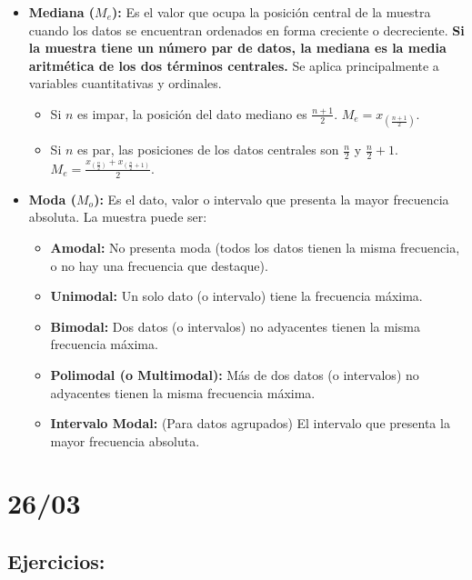 \documentclass[12pt, letterpaper]{article}
\begin{document}
\begin{itemize}
    \item \textbf{Mediana ($M_e$):} Es el valor que ocupa la posición central de la muestra cuando los datos se encuentran ordenados en forma creciente o decreciente. \textbf{Si la muestra tiene un número par de datos, la mediana es la media aritmética de los dos términos centrales.} Se aplica principalmente a variables cuantitativas y ordinales.
        \begin{itemize}
            \item Si $n$ es impar, la posición del dato mediano es $\frac{n+1}{2}$. $M_e = x_{(\frac{n+1}{2})}$.
            \item Si $n$ es par, las posiciones de los datos centrales son $\frac{n}{2}$ y $\frac{n}{2}+1$. $M_e = \frac{x_{(\frac{n}{2})} + x_{(\frac{n}{2}+1)}}{2}$.
        \end{itemize}
    \item \textbf{Moda ($M_o$):} Es el dato, valor o intervalo que presenta la mayor frecuencia absoluta. La muestra puede ser:
        \begin{itemize}
            \item \textbf{Amodal:} No presenta moda (todos los datos tienen la misma frecuencia, o no hay una frecuencia que destaque).
            \item \textbf{Unimodal:} Un solo dato (o intervalo) tiene la frecuencia máxima.
            \item \textbf{Bimodal:} Dos datos (o intervalos) no adyacentes tienen la misma frecuencia máxima.
            \item \textbf{Polimodal (o Multimodal):} Más de dos datos (o intervalos) no adyacentes tienen la misma frecuencia máxima.
            \item \textbf{Intervalo Modal:} (Para datos agrupados) El intervalo que presenta la mayor frecuencia absoluta.
        \end{itemize}
\end{itemize}
\newpage

\section{26/03}
\subsection{Ejercicios:}
\end{document}
